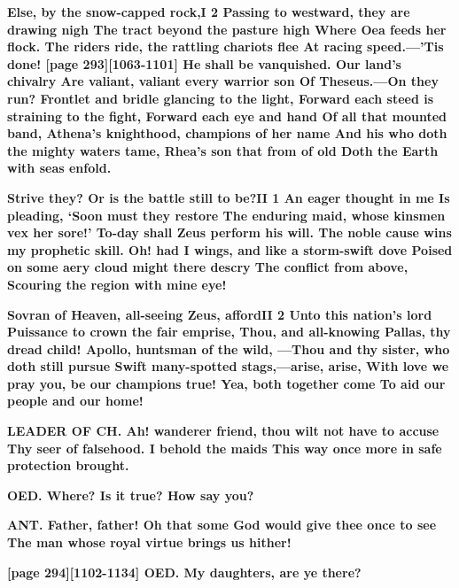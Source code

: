 \documentclass[11pt,letter]{book}
\begin{document}
\par \textbf{Else, by the snow-capped rock,I 2 Passing to westward, they are drawing nigh The tract beyond the pasture high Where Oea feeds her flock. The riders ride, the rattling chariots flee At racing speed.—’Tis done! [page 293][1063-1101] He shall be vanquished. Our land’s chivalry Are valiant, valiant every warrior son Of Theseus.—On they run? Frontlet and bridle glancing to the light, Forward each steed is straining to the fight, Forward each eye and hand Of all that mounted band, Athena’s knighthood, champions of her name And his who doth the mighty waters tame, Rhea’s son that from of old Doth the Earth with seas enfold.}
\par 

\par \textbf{Strive they? Or is the battle still to be?II 1 An eager thought in me Is pleading, ‘Soon must they restore The enduring maid, whose kinsmen vex her sore!’ To-day shall Zeus perform his will. The noble cause wins my prophetic skill. Oh! had I wings, and like a storm-swift dove Poised on some aery cloud might there descry The conflict from above, Scouring the region with mine eye!}
\par 

\par \textbf{Sovran of Heaven, all-seeing Zeus, affordII 2 Unto this nation’s lord Puissance to crown the fair emprise, Thou, and all-knowing Pallas, thy dread child! Apollo, huntsman of the wild, —Thou and thy sister, who doth still pursue Swift many-spotted stags,—arise, arise, With love we pray you, be our champions true! Yea, both together come To aid our people and our home!}
\par 

\par \textbf{LEADER OF CH. Ah! wanderer friend, thou wilt not have to accuse Thy seer of falsehood. I behold the maids This way once more in safe protection brought.}
\par 

\par \textbf{OED. Where? Is it true? How say you?}
\par 

\par \textbf{ANT. Father, father! Oh that some God would give thee once to see The man whose royal virtue brings us hither!}
\par 

\par \textbf{[page 294][1102-1134] OED. My daughters, are ye there?}
\par 
\end{document}
